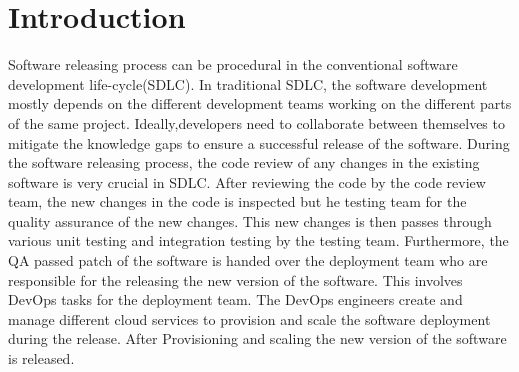 
\section{Introduction}
Software  releasing  process  can  be  procedural  in  the  conventional  software  development life-cycle(SDLC). In traditional SDLC, the software development mostly depends on the different development teams working on the different parts of the same project.  Ideally,developers  need  to  collaborate  between  themselves  to  mitigate  the  knowledge  gaps  to ensure a successful release of the software.  During the software releasing process, the code review of any changes in the existing software is very crucial in SDLC. After reviewing the code by the code review team, the new changes in the code is inspected but he testing team for the quality assurance of the new changes.  This new changes is then passes through various unit testing and integration testing by the testing team.  Furthermore,  the QA passed  patch  of  the  software  is  handed  over  the  deployment  team  who  are  responsible for  the  releasing  the  new  version  of  the  software.   This  involves  DevOps  tasks  for  the deployment team.  The DevOps engineers create and manage different cloud services to provision and scale the software deployment during the release.  After Provisioning and scaling the new version of the software is released.